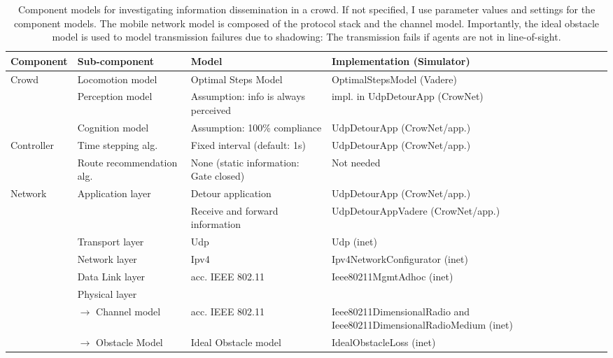 \begin{table}[hbt!]
\begin{footnotesize}
\begin{tabular}{|p{2cm}|p{2.6cm}p{3.2cm}p{5cm}|}
\hline
\textbf{Component} & \textbf{Sub-component} & \textbf{Model}  & \textbf{Implementation (Simulator)} \\ \hline
Crowd  & Locomotion model & Optimal Steps Model & OptimalStepsModel (Vadere) \\ \cline{2-4}
& Perception model &  Assumption: info is always perceived & impl. in UdpDetourApp (CrowNet)  \\ \cline{2-4}
& Cognition model & Assumption: 100\% compliance & UdpDetourApp (CrowNet/app.)  \\ \hline

Controller &
Time stepping alg. & Fixed interval (default: 1s) & UdpDetourApp (CrowNet/app.)  \\ \cline{2-4}
&  Route recommendation alg. & None (static information: Gate closed) & Not needed \\ \hline

Network & Application layer & Detour application &  UdpDetourApp  (CrowNet/app.) \\ \cline{3-4}
&& Receive and forward information &  UdpDetourAppVadere  (CrowNet/app.) \\ \cline{2-4}
&Transport layer & Udp  & {Udp} (inet) \\ \cline{2-4}
&Network layer & Ipv4  &{Ipv4NetworkConfigurator} (inet) \\ \cline{2-4}
&Data Link layer & acc. IEEE 802.11 & {Ieee80211MgmtAdhoc} (inet)   \\ \cline{2-4}
&Physical layer &  & \\  
&$\rightarrow$ Channel model & acc. IEEE 802.11 & {Ieee80211DimensionalRadio} and Ieee80211DimensionalRadioMedium (inet) \\ 
&$\rightarrow$ Obstacle Model & Ideal Obstacle model & IdealObstacleLoss (inet)  \\ 

\hline
\end{tabular} 
\end{footnotesize}
\caption[Component models for investigating information dissemination in a crowd]{Component  models for investigating information dissemination in a crowd. If not specified, I use parameter values and settings for the component models. The mobile network model is composed of the protocol stack and the channel model. Importantly, the ideal obstacle model is used to model transmission failures due to shadowing: The transmission fails if agents are not in line-of-sight.}
\label{tab:composedmodelstudy1}
\end{table}




